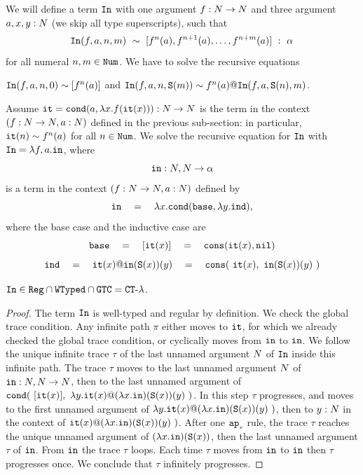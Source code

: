 \begin{Eg}
We will define a term ${\tt In}$ with one argument $f:{N} \rightarrow {N}$ and three argument
$a,x,y:{N}$ (we skip all type superscripts), such that 
\[
{\tt In}(f,a,n,m) \  \sim \ [f^n(a), f^{n+1}(a), \ldots, f^{n+m}(a)] \  : \ \alpha
\]
for all numeral $n,m \in {\tt Num}$. 
We have to solve the recursive equations 
\begin{center}
  ${\tt In}(f,a,n,0) \sim [f^n(a)]$
  \quad
  and
  \quad
  ${\tt In}(f,a,n,{\tt S} (m))  \sim f^n(a) @ {\tt In}(f,a,{\tt S}(n),m)$.
\end{center}
Assume ${\tt it} = {\tt cond} (a, \lambda x.f({\tt it}(x))):{N} \rightarrow {N}$ is the term
in the context $(f:{N}\rightarrow{N}, a:{N})$ defined 
in the previous sub-section: in particular, ${\tt it}(n) \sim f^n(a)$ for all $n \in {\tt Num}$.
We solve the recursive equation for ${\tt In}$ with ${\tt In} = \lambda f,a.{\tt in}$,
where 
\[
{\tt in}:{N},{N} \rightarrow \alpha
\]
is a term in the context $(f:{N}\rightarrow{N}, a:{N})$ defined by 
\[
\interval 
\ \ \ = \ \ \ 
\lambda x.\cond (\base,  \lambda y.\inductive),
\]
where the base case and the inductive case are
\[
\base 
\ \ \ =\ \ \  
[\iter(x)]
\ \ \ =\ \ \ 
\cons(\iter(x),\nil)
\]
\[
\inductive 
\ \ \ = \ \ \ 
\iter(x) @ \interval(\Succ(x))(y)
\ \ \ = \ \ \  
\cons(\ \iter(x), \ \interval(\Succ(x))(y) \ )
\]
\end{Eg}

\begin{proposition}
${\tt In} \in {\tt Reg} \cap {\tt WTyped} \cap {\tt GTC} = { {\tt CT}\mbox{-}\lambda}$.
\end{proposition}

\begin{proof}
The term ${\tt In}$ is well-typed and regular by definition. We check the global trace condition.
Any infinite path $\pi$ either moves to ${\tt it}$, for which we already checked the global trace condition,
or cyclically moves from ${\tt in}$ to ${\tt in}$.
We follow the unique infinite 
trace $\tau$ of the last unnamed argument ${N}$ of ${\tt In}$ inside this infinite path.
The trace $\tau$ moves to the last unnamed argument ${N}$ of  
${\tt in}:{N},{N} \rightarrow {N}$, then to the last unnamed argument of
$\cond (\ [\iter(x)],  \  \lambda y.\iter(x) @ (\lambda x.\interval)(\Succ(x))(y) \ )$.
In this step $\tau$ progresses, and moves to 
the first unnamed argument of $\lambda y.{\tt it}(x) @ (\lambda x.{\tt in})({\tt S}(x))(y) \ )$,
then to $y:{N}$ in the context of $\iter(x) @ (\lambda x.\interval)(\Succ(x))(y) \ )$.
After one ${{\tt ap}_{\mbox{\tiny $v$}}}$ rule, the trace $\tau$ reaches the unique unnamed argument of 
$(\lambda x.{\tt in})({\tt S}(x))$, then the last unnamed argument $\tau$ of ${\tt in}$. 
From ${\tt in}$ the trace $\tau$ loops. Each time $\tau$ moves from ${\tt in}$ to ${\tt in}$
then $\tau$ progresses once. We conclude that $\tau$ infinitely progresses.
\end{proof}

